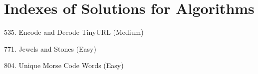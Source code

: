 \tocless\section{Indexes of Solutions for Algorithms}
\label{sec:algo_ind}

\begin{flushleft}
535. Encode and Decode TinyURL (Medium)\hfill\pageref{algo:535}

771. Jewels and Stones (Easy)\hfill\pageref{algo:771}

804. Unique Morse Code Words (Easy)\hfill\pageref{algo:804}
\end{flushleft}

\newpage
